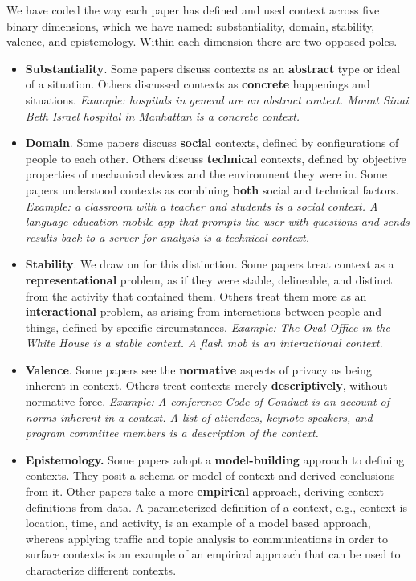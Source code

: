 \documentclass[../thesis.tex]{subfiles}
\newcommand\liststyleWWNumii{%
\renewcommand\labelitemi{${\bullet}$}
\renewcommand\labelitemii{${\circ}$}
\renewcommand\labelitemiii{${\blacksquare}$}
\renewcommand\labelitemiv{${\bullet}$}
}
\begin{document}
We have coded the way each paper has defined and used context across
five binary dimensions, which we have named: substantiality, domain,
stability, valence, and epistemology. Within each dimension there are
two opposed poles.

\bigskip

\liststyleWWNumii
\begin{itemize}
\item \textbf{Substantiality}. Some papers discuss contexts as an
\textbf{abstract} type or ideal of a situation. Others discussed
contexts as \textbf{concrete} happenings and situations.
\textit{Example: hospitals in general are an abstract context. Mount
Sinai Beth Israel hospital in Manhattan is a concrete context.}
\item \textbf{Domain}. Some papers discuss \textbf{social} contexts,
defined by configurations of people to each other. Others discuss
\textbf{technical} contexts, defined by objective properties of
mechanical devices and the environment they were in. Some papers
understood contexts as combining \textbf{both} social and technical
factors. \textit{Example: a classroom with a teacher and students is a
social context. A language education mobile app that prompts the user
with questions and sends results back to a server for analysis is a
technical context.}
\item \textbf{Stability}. We draw on \citet{dourish2004we} for this
distinction. Some papers treat context as a \textbf{representational}
problem, as if they were stable, delineable, and distinct from the
activity that contained them. Others treat them more as an
\textbf{interactional} problem, as arising from interactions between
people and things, defined by specific circumstances. \textit{Example:
The Oval Office in the White House is a stable context. A flash mob is
an interactional context}.
\item \textbf{Valence}. Some papers see the \textbf{normative} aspects
of privacy as being inherent in context. Others treat contexts merely
\textbf{descriptively}, without normative force. \textit{Example: A
conference Code of Conduct is an account of norms inherent in a
context. A list of attendees, keynote speakers, and program committee
members is a description of the context.}
\item \textbf{Epistemology. }Some papers adopt a \textbf{model-building}
approach to defining contexts. They posit a schema or model of context
and derived conclusions from it. Other papers take a more
\textbf{empirical} approach, deriving context definitions from data. A
parameterized definition of a context, e.g., context is location, time,
and activity, is an example of a model based approach, whereas applying
traffic and topic analysis to communications in order to surface
contexts is an example of an empirical approach that can be used to
characterize different contexts.
\end{itemize}
\end{document}
